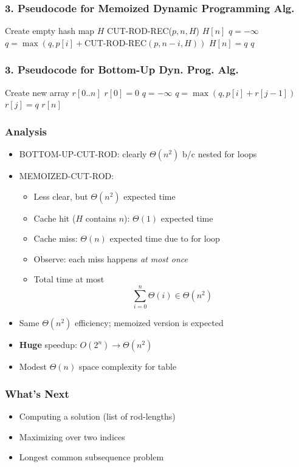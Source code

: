 \documentclass{beamer}
\begin{document}
\begin{frame} \frametitle{3. Pseudocode for \textbf{Memoized} Dynamic Programming Alg.}
      {\footnotesize
      \begin{algorithmic}[1]
        \State Create empty hash map $H$
        \State \Return CUT-ROD-REC($p, n, H$)
        \EndFunction
        \State \Return $H[n]$
        \EndIf
        \State {}
      \EndIf
      \State $q = -\infty$
        \State $q = \max(q, p[i] + \text{CUT-ROD-REC}(p, n-i, H))$
        \EndFor
        \State $H[n] = q$
      \State \Return $q$
    \EndFunction
      \end{algorithmic}
      }
\end{frame}

\begin{frame} \frametitle{3. Pseudocode for \textbf{Bottom-Up} Dyn. Prog. Alg.}
  \begin{algorithmic}[1]
    \State Create new array $r[0..n]$
    \State $r[0] = 0$ 
     
      \State $q = -\infty$
        \State $q = \max(q, p[i] + r[j-1])$ 
      \EndFor
      \State $r[j] = q$
      \EndFor
      \State \Return $r[n]$
      \EndFunction
  \end{algorithmic}
  \end{frame}

\begin{frame} \frametitle{Analysis}
  \begin{itemize}
  \item BOTTOM-UP-CUT-ROD: clearly $\Theta(n^2)$ b/c nested for loops
  \item MEMOIZED-CUT-ROD:
    \begin{itemize}
    \item Less clear, but $\Theta(n^2)$ expected time
    \item Cache hit ($H$ contains $n$): $\Theta(1)$ expected time
    \item Cache miss: $\Theta(n)$ expected time due to for loop
    \item Observe: each miss happens \emph{at most once}
    \item Total time at most
      \[ \sum_{i=0}^n \Theta(i) \in \Theta(n^2) \]
    \end{itemize}
  \item Same $\Theta(n^2)$ efficiency; memoized version is expected
  \item \textbf{Huge} speedup: $O(2^n) \longrightarrow \Theta(n^2)$
  \item Modest $\Theta(n)$ space complexity for table
  \end{itemize}
\end{frame}

\begin{frame} \frametitle{What's Next}
  \begin{itemize}
  \item Computing a solution (list of rod-lengths)
  \item Maximizing over two indices
  \item Longest common subsequence problem
  \end{itemize}
\end{frame}
\end{document}
